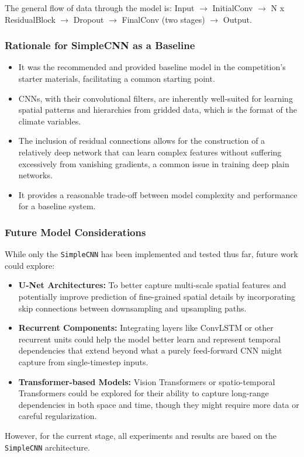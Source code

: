 \documentclass{article}
\begin{document}
The general flow of data through the model is:
Input \(\rightarrow\) InitialConv \(\rightarrow\) N x ResidualBlock \(\rightarrow\) Dropout \(\rightarrow\) FinalConv (two stages) \(\rightarrow\) Output.

\subsubsection{Rationale for SimpleCNN as a Baseline}
\begin{itemize}
    \item It was the recommended and provided baseline model in the competition's starter materials, facilitating a common starting point.
    \item CNNs, with their convolutional filters, are inherently well-suited for learning spatial patterns and hierarchies from gridded data, which is the format of the climate variables.
    \item The inclusion of residual connections allows for the construction of a relatively deep network that can learn complex features without suffering excessively from vanishing gradients, a common issue in training deep plain networks.
    \item It provides a reasonable trade-off between model complexity and performance for a baseline system.
\end{itemize}

\subsubsection{Future Model Considerations}
While only the \texttt{SimpleCNN} has been implemented and tested thus far, future work could explore:
\begin{itemize}
    \item \textbf{U-Net Architectures:} To better capture multi-scale spatial features and potentially improve prediction of fine-grained spatial details by incorporating skip connections between downsampling and upsampling paths.
    \item \textbf{Recurrent Components:} Integrating layers like ConvLSTM or other recurrent units could help the model better learn and represent temporal dependencies that extend beyond what a purely feed-forward CNN might capture from single-timestep inputs.
    \item \textbf{Transformer-based Models:} Vision Transformers or spatio-temporal Transformers could be explored for their ability to capture long-range dependencies in both space and time, though they might require more data or careful regularization.
\end{itemize}
However, for the current stage, all experiments and results are based on the \texttt{SimpleCNN} architecture.
\end{document}

